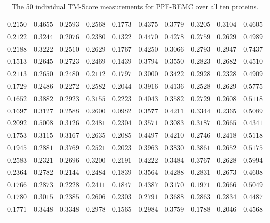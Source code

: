 \begin{longtable}{c|c|c|c|c|c|c|c|c|c}
$0.2150$ & $0.4655$ & $0.2593$ & $0.2568$ & $0.1773$ & $0.4375$ & $0.3779$ & $0.3205$ & $0.3104$ & $0.4605$ \\ \hline
$0.2122$ & $0.3244$ & $0.2076$ & $0.2380$ & $0.1322$ & $0.4470$ & $0.4278$ & $0.2759$ & $0.2629$ & $0.4989$ \\ \hline
$0.2188$ & $0.3222$ & $0.2510$ & $0.2629$ & $0.1767$ & $0.4250$ & $0.3066$ & $0.2793$ & $0.2947$ & $0.7437$ \\ \hline
$0.1513$ & $0.2645$ & $0.2723$ & $0.2469$ & $0.1439$ & $0.3794$ & $0.3550$ & $0.2823$ & $0.2682$ & $0.4510$ \\ \hline
$0.2113$ & $0.2650$ & $0.2480$ & $0.2112$ & $0.1797$ & $0.3000$ & $0.3422$ & $0.2928$ & $0.2328$ & $0.4909$ \\ \hline
$0.1729$ & $0.2486$ & $0.2272$ & $0.2582$ & $0.2044$ & $0.3916$ & $0.4136$ & $0.2528$ & $0.2629$ & $0.5775$ \\ \hline
$0.1652$ & $0.3882$ & $0.2923$ & $0.3155$ & $0.2223$ & $0.4043$ & $0.3582$ & $0.2729$ & $0.2608$ & $0.5118$ \\ \hline
$0.1697$ & $0.3127$ & $0.2588$ & $0.2600$ & $0.0982$ & $0.3577$ & $0.4211$ & $0.3344$ & $0.2365$ & $0.5089$ \\ \hline
$0.2092$ & $0.5008$ & $0.3126$ & $0.2481$ & $0.2304$ & $0.3571$ & $0.3083$ & $0.3187$ & $0.2665$ & $0.4341$ \\ \hline
$0.1753$ & $0.3115$ & $0.3167$ & $0.2635$ & $0.2085$ & $0.4497$ & $0.4210$ & $0.2746$ & $0.2418$ & $0.5118$ \\ \hline
$0.1945$ & $0.2881$ & $0.3769$ & $0.2521$ & $0.2023$ & $0.3963$ & $0.3830$ & $0.3861$ & $0.2652$ & $0.5175$ \\ \hline
$0.2583$ & $0.2321$ & $0.2696$ & $0.3200$ & $0.2191$ & $0.4222$ & $0.3484$ & $0.3767$ & $0.2628$ & $0.5994$ \\ \hline
$0.2364$ & $0.2782$ & $0.2144$ & $0.2484$ & $0.1839$ & $0.3564$ & $0.4288$ & $0.2831$ & $0.2673$ & $0.4608$ \\ \hline
$0.1766$ & $0.2873$ & $0.2228$ & $0.2411$ & $0.1847$ & $0.4387$ & $0.3170$ & $0.1971$ & $0.2666$ & $0.5049$ \\ \hline
$0.1780$ & $0.3015$ & $0.2385$ & $0.2606$ & $0.2303$ & $0.2791$ & $0.3688$ & $0.2863$ & $0.2834$ & $0.4487$ \\ \hline
$0.1771$ & $0.3448$ & $0.3348$ & $0.2978$ & $0.1565$ & $0.2984$ & $0.3759$ & $0.1788$ & $0.2046$ & $0.4568$ \\ \hline
\caption{The 50 individual TM-Score measurements for PPF-REMC over all ten proteins.}
\end{longtable}
